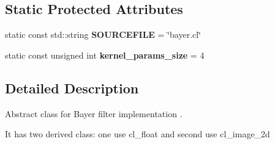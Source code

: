 \subsection*{Static Protected Attributes}
\begin{DoxyCompactItemize}
\item 
\hypertarget{class_open_c_l_bayer_filter_adaa7ba3b18e1e8f38a71aab1281786d7}{static const std\-::string {\bfseries S\-O\-U\-R\-C\-E\-F\-I\-L\-E} = \char`\"{}bayer.\-cl\char`\"{}}\label{class_open_c_l_bayer_filter_adaa7ba3b18e1e8f38a71aab1281786d7}

\item 
\hypertarget{class_open_c_l_bayer_filter_a7d460b328cc4ca3c32f0b94d0855c778}{static const unsigned int {\bfseries kernel\-\_\-params\-\_\-size} = 4}\label{class_open_c_l_bayer_filter_a7d460b328cc4ca3c32f0b94d0855c778}

\end{DoxyCompactItemize}


\subsection{Detailed Description}
Abstract class for Bayer filter implementation . 

It has two derived class\-: one use cl\-\_\-float and second use cl\-\_\-image\-\_\-2d 


